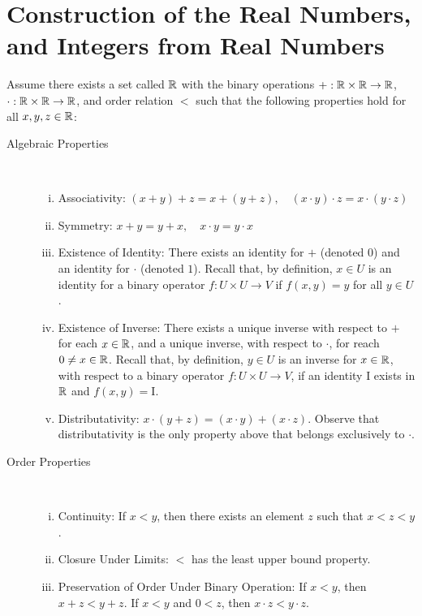 \section{Construction of the Real Numbers, and Integers from Real Numbers} 
\begin{definition}
Assume there exists a set called $\mathbb{R}$ with the binary operations $+: \mathbb{R} \times
\mathbb{R} \to \mathbb{R}$, $\cdot: \mathbb{R} \times \mathbb{R} \to \mathbb{R}$, and order relation $<$
such that the following properties hold for all $x,y,z \in \mathbb{R}$:
\begin{description}
	\item[Algebraic Properties]\
\begin{enumerate}[(i)]
	\item{Associativity:} $(x + y) + z = x + (y+z), \quad (x \cdot y) \cdot z = x
		\cdot (y \cdot z)$
\item{Symmetry:} $x + y = y + x, \quad x \cdot y = y \cdot x$
\item{Existence of Identity:} There exists an identity for $+$ (denoted $0$) and
	an identity for $\cdot$ (denoted $1$). Recall that, by definition, $x \in U$
	is an identity for a binary operator $f: U\times U \to V$ if $f(x,y) = y$ for
	all $y \in U$.
\item{Existence of Inverse:} There exists a unique inverse
	with respect to $+$ for each $x \in \mathbb{R}$, and a unique inverse, with respect
	to $\cdot$, for reach $0 \neq x \in \mathbb{R}$. Recall that, by definition,
	$y \in U$ is an inverse for $x \in \mathbb{R}$, with respect to a binary operator $f:
	U \times U \to V$, if an identity I exists in $\mathbb{R}$ and $f(x,y) = \mathrm{I}$.  
\item{Distributativity:} $x \cdot (y+z) = (x \cdot y) + (x \cdot z)$.
Observe that distributativity is the only property above that belongs
exclusively to $\cdot$.
\end{enumerate}
\item[Order Properties]\
	\begin{enumerate}[(vi)]
\item{Continuity:}
If $x<y$, then there exists an element $z$ such that $x <z < y$.
\item{Closure Under Limits:} $<$ has the least upper bound property.
\item{Preservation of Order Under Binary Operation:} If $x < y$, then $x + z < y
	+ z$. If $x < y$ and $0 < z$, then $x \cdot z < y \cdot z$.
\end{enumerate}
\end{description}
\end{definition}
